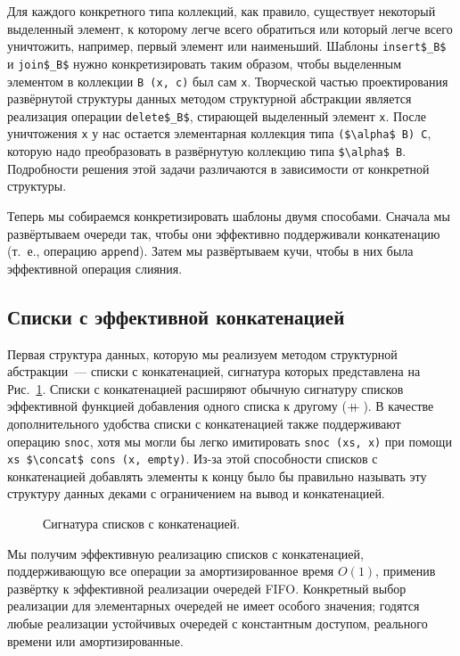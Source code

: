 Для каждого конкретного типа коллекций, как правило, существует
некоторый выделенный элемент, к которому легче всего обратиться или
который легче всего уничтожить, например, первый элемент или
наименьший.  Шаблоны \lstinline!insert$_B$! и
\lstinline!join$_B$! нужно конкретизировать таким образом, чтобы
выделенным элементом в коллекции \lstinline!B (x, c)! был сам
\lstinline!x!. Творческой частью проектирования развёрнутой структуры
данных методом структурной абстракции является реализация операции
\lstinline!delete$_B$!, стирающей выделенный элемент \lstinline!x!.
После уничтожения \lstinline!x! у нас остается элементарная коллекция
типа \lstinline!($\alpha$ B) C!, которую надо преобразовать в
развёрнутую коллекцию типа \lstinline!$\alpha$ B!. Подробности
решения этой задачи различаются в зависимости от конкретной структуры.

Теперь мы собираемся конкретизировать шаблоны двумя способами. Сначала
мы развёртываем очереди так, чтобы они эффективно поддерживали конкатенацию
(т.~е., операцию \lstinline!append!). Затем мы развёртываем кучи,
чтобы в них была эффективной операция слияния.

\subsection{Списки с эффективной конкатенацией}
\label{sc:10.2.1}

Первая структура данных, которую мы реализуем методом структурной
абстракции~--- списки с конкатенацией, сигнатура которых представлена
на Рис.~\ref{fig:10.3}. Списки с конкатенацией расширяют обычную
сигнатуру списков эффективной функцией добавления одного списка к
другому ($+\!\!\!+\,$). В качестве дополнительного удобства списки с
конкатенацией также поддерживают операцию \lstinline!snoc!, хотя мы
могли бы легко имитировать \lstinline!snoc (xs, x)! при помощи 
\lstinline!xs $\concat$ cons (x, empty)!. Из-за этой
способности списков с конкатенацией добавлять элементы к концу было бы
правильно называть эту структуру данных деками с ограничением на вывод и
конкатенацией. 

\begin{figure}
  \centering
  
  \caption{Сигнатура списков с конкатенацией.}
  \label{fig:10.3}
\end{figure}

Мы получим эффективную реализацию списков с конкатенацией,
поддерживающую все операции за амортизированное время $O(1)$, применив
развёртку к эффективной реализации очередей FIFO. Конкретный выбор
реализации для элементарных очередей не имеет особого значения;
годятся любые реализации устойчивых очередей с константным доступом,
реального времени или амортизированные.

